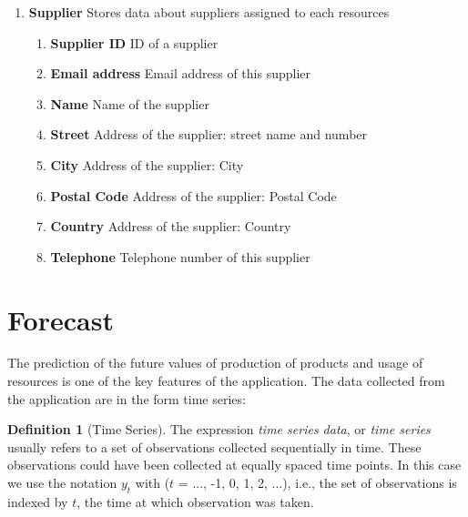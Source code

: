 \documentclass[a4paper,11pt,twoside]{report}
\theoremstyle{definition}
\newtheorem{definition}[theorem]{Definition}
\begin{document}
\begin{enumerate}
\item \textbf{Supplier} Stores data about suppliers assigned to each resources
\begin{enumerate}
\item \textbf{Supplier ID} ID of a supplier
\item \textbf{Email address} Email address of this supplier
\item \textbf{Name} Name of the supplier
\item \textbf{Street} Address of the supplier: street name and number
\item \textbf{City} Address of the supplier: City
\item \textbf{Postal Code} Address of the supplier: Postal Code
\item \textbf{Country} Address of the supplier: Country
\item \textbf{Telephone} Telephone number of this supplier
\end{enumerate}

\end{enumerate}

\section{Forecast}

The prediction of the future values of production of products and usage of resources is one of the key features of the application.
The data collected from the application are in the form time series:
\begin{definition}[Time Series]
The expression \textit{time series data}, or \textit{time series} usually refers to a set of observations collected sequentially in time. These observations could have been collected at equally spaced time points. In this case we use the notation $y_t$ with ($t$ = ..., -1, 0, 1, 2, ...), i.e., the set of observations is indexed by $t$, the time at which observation was taken.
\end{definition}
\end{document}
